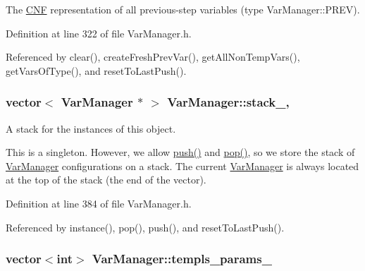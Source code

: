 The \hyperlink{classCNF}{C\-N\-F} representation of all previous-\/step variables (type Var\-Manager\-::\-P\-R\-E\-V). 



Definition at line 322 of file Var\-Manager.\-h.



Referenced by clear(), create\-Fresh\-Prev\-Var(), get\-All\-Non\-Temp\-Vars(), get\-Vars\-Of\-Type(), and reset\-To\-Last\-Push().

\hypertarget{classVarManager_aba622884c64d1a16cd086b34cb71acd8}{
\subsubsection[{stack\-\_\-}]{\setlength{\rightskip}{0pt plus 5cm}vector$<$ {\bf Var\-Manager} $\ast$ $>$ Var\-Manager\-::stack\-\_\-\hspace{0.3cm}{\ttfamily [static]}, {\ttfamily [private]}}}\label{classVarManager_aba622884c64d1a16cd086b34cb71acd8}
A stack for the instances of this object.

This is a singleton. However, we allow \hyperlink{classVarManager_a8ca6373bb644693c2995e6473b47566f}{push()} and \hyperlink{classVarManager_a6f2350621a62b97ca06d3469dc9d65f1}{pop()}, so we store the stack of \hyperlink{classVarManager}{Var\-Manager} configurations on a stack. The current \hyperlink{classVarManager}{Var\-Manager} is always located at the top of the stack (the end of the vector). 

Definition at line 384 of file Var\-Manager.\-h.



Referenced by instance(), pop(), push(), and reset\-To\-Last\-Push().

\hypertarget{classVarManager_aea1a2e16d5a0ff433d47a4f28cc2ae3b}{
\subsubsection[{templs\-\_\-params\-\_\-}]{\setlength{\rightskip}{0pt plus 5cm}vector$<$int$>$ Var\-Manager\-::templs\-\_\-params\-\_\-\hspace{0.3cm}{\ttfamily [protected]}}}\label{classVarManager_aea1a2e16d5a0ff433d47a4f28cc2ae3b}


